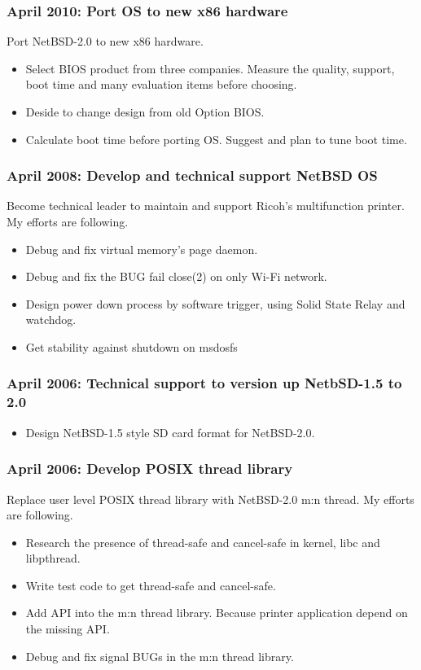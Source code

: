 \documentclass[letterpaper]{article}
\begin{document}
\subsubsection*{April 2010: Port OS to new x86 hardware}
Port NetBSD-2.0 to new x86 hardware.

\begin{itemize}
  \item Select BIOS product from three companies. Measure the quality, support, boot time and many evaluation items before choosing.
  \item Deside to change design from old Option BIOS.
  \item Calculate boot time before porting OS. Suggest and plan to tune boot time.
\end{itemize}

\subsubsection*{April 2008: Develop and technical support NetBSD OS}
Become technical leader to maintain and support Ricoh's multifunction printer.
My efforts are following.
\begin{itemize}
  \item Debug and fix virtual memory's page daemon.
  \item Debug and fix the BUG fail close(2) on only Wi-Fi network.
  \item Design power down process by software trigger, using Solid State Relay and watchdog.
  \item Get stability against shutdown on msdosfs
\end{itemize}

\subsubsection*{April 2006: Technical support to version up NetbSD-1.5 to 2.0}

\begin{itemize}
  \item Design NetBSD-1.5 style SD card format for NetBSD-2.0.
\end{itemize}

\subsubsection*{April 2006: Develop POSIX thread library}
Replace user level POSIX thread library with NetBSD-2.0 m:n thread.
My efforts are following.
\begin{itemize}
  \item Research the presence of thread-safe and cancel-safe in kernel, libc and libpthread.
  \item Write test code to get thread-safe and cancel-safe.
  \item Add API into the m:n thread library. Because printer application depend on the missing API.
  \item Debug and fix signal BUGs in the m:n thread library.
\end{itemize}
\end{document}
